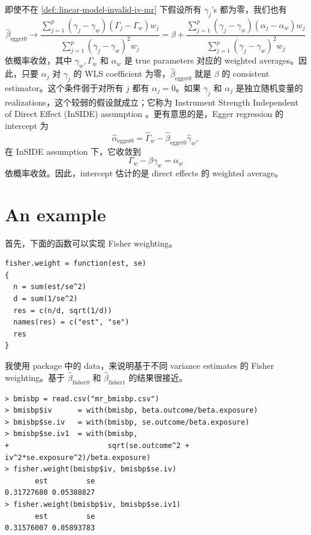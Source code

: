 即使不在 \cref{def::linear-model-invalid-iv-mr} 下假设所有 $\gamma_j$'s 都为零，我们也有
$$
\hat{\beta}_{\text{egger}0} \rightarrow 
\frac{  \sum_{j=1}^p  (  \gamma_j  -   \gamma_w) ( \Gamma_j -   \Gamma_w) w_j     }
{ \sum_{j=1}^p  (  \gamma_j  -  \gamma_w) ^2 w_j }
=\beta + \frac{  \sum_{j=1}^p  (  \gamma_j  -   \gamma_w) ( \alpha_j -   \alpha_w) w_j     }
{ \sum_{j=1}^p  (  \gamma_j  -  \gamma_w) ^2 w_j }
$$
依概率收敛，其中 $\gamma_w, \Gamma_w$ 和 $\alpha_w$ 是 true parameters 对应的 weighted averages。因此，只要 $\alpha_j$ 对 $\gamma_j$ 的 WLS coefficient 为零，$\hat{\beta}_{\text{egger}0} $ 就是 $\beta$ 的 consistent estimator。这个条件弱于对所有 $j$ 都有 $\alpha_j=0$。如果 $\gamma_j$ 和 $\alpha_j$ 是独立随机变量的 realizations，这个较弱的假设就成立；它称为 Instrument Strength Independent of Direct Effect (InSIDE) assumption \citep{bowden2015mendelian}。更有意思的是，Egger regression 的 intercept 为
$$
\hat{\alpha}_{\text{egger}0}  = \hat \Gamma_w - \hat{\beta}_{\text{egger}0}  \hat \gamma_w,
$$
在 InSIDE assumption 下，它收敛到
$$
\Gamma_w -  \beta  \gamma_w = \alpha_w
$$
依概率收敛。因此，intercept 估计的是 direct effects 的 weighted average。


\section{An example}
\label{sec::mr-examples}

首先，下面的函数可以实现 Fisher weighting。
 \begin{lstlisting}
fisher.weight = function(est, se)
{
  n = sum(est/se^2)
  d = sum(1/se^2)
  res = c(n/d, sqrt(1/d))
  names(res) = c("est", "se")
  res
}
\end{lstlisting}

我使用  package \citep{zhao2020statistical} 中的  data，来说明基于不同 variance estimates 的 Fisher weighting。基于 $\hat{\beta}_{\text{fisher}0} $ 和 $\hat{\beta}_{\text{fisher}1} $ 的结果很接近。
 \begin{lstlisting}
> bmisbp = read.csv("mr_bmisbp.csv")
> bmisbp$iv      = with(bmisbp, beta.outcome/beta.exposure)
> bmisbp$se.iv   = with(bmisbp, se.outcome/beta.exposure)
> bmisbp$se.iv1  = with(bmisbp,
+                       sqrt(se.outcome^2 + iv^2*se.exposure^2)/beta.exposure)
> fisher.weight(bmisbp$iv, bmisbp$se.iv)
       est         se 
0.31727680 0.05388827 
> fisher.weight(bmisbp$iv, bmisbp$se.iv1)
       est         se 
0.31576007 0.05893783
\end{lstlisting}


